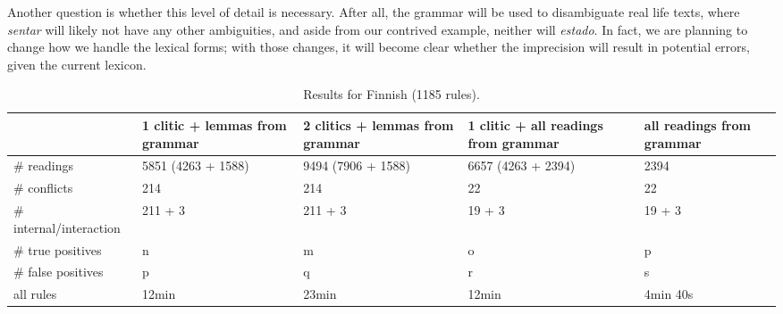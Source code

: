 Another question is whether this level of detail is necessary. 
After all, the grammar will be used to disambiguate real life texts, where \emph{sentar} will likely not have any other ambiguities, and aside from our contrived example, neither will \emph{estado}. 
In fact, we are planning to change how we handle the lexical forms; with those changes, it will become clear whether the imprecision will result in potential errors, given the current lexicon. 





\begin{table*}[t!]
\centering
\begin{tabular}{|p{2.5cm}|p{3cm}|p{3cm}|p{3cm}|p{3cm}|}

\hline
              & 1 clitic + 
                lemmas from 
                 grammar & 2 clitics 
                           + lemmas from 
                              grammar & 1 clitic +
                                          all readings 
                                          from grammar    & all readings from grammar \\ \hline
\# readings   & 5851 (4263 
                 + 1588) & 9494
                       (7906 + 1588) & 6657 (4263 + 2394) & 2394  \\ \hline
\# conflicts  & 214      & 214       & 22                & 22  \\ \hline
\# internal/interaction & 211 + 3    & 211 + 3           & 19 + 3    & 19 + 3  \\ \hline

\# true 
   positives  & n        & m         & o                & p  \\ \hline
\# false 
   positives  & p        & q         & r                & s   \\ \hline
\clock{}all 
       rules & 12min     & 23min     & 12min &  4min 40s \\ \hline


\end{tabular}
\caption{Results for Finnish (1185 rules).}
\label{table:resFin}
\end{table*}

